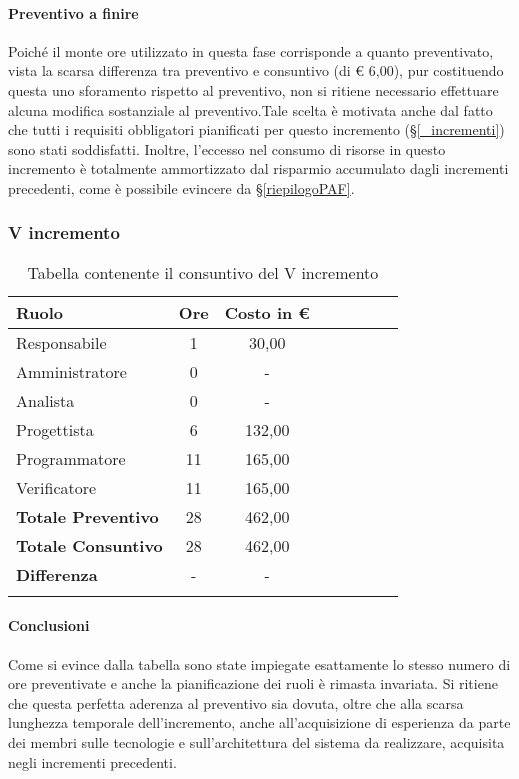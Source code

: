 \paragraph{Preventivo a finire}
Poiché il monte ore utilizzato in questa fase corrisponde a quanto preventivato, vista la scarsa differenza tra preventivo e consuntivo (di € 6,00), pur costituendo questa uno sforamento rispetto al preventivo, non si ritiene necessario effettuare alcuna modifica sostanziale al preventivo.Tale scelta è motivata anche dal fatto che tutti i requisiti obbligatori pianificati per questo incremento (\S\ref{_incrementi}) sono stati soddisfatti. Inoltre, l'eccesso nel consumo di risorse in questo incremento è totalmente ammortizzato dal risparmio accumulato dagli incrementi precedenti, come è possibile evincere da \S\ref{riepilogoPAF}.

\subsubsection{V incremento}\label{_consuntivoImp2}
\begin{longtable}{|l|c|c|c|c|c|c|c|}
	\hline
	\rowcolor{lighter-grayer}
	\textbf{Ruolo}             & \textbf{Ore} & \textbf{Costo in €} \\
	\hline
	\endfirsthead

	\hline
	Responsabile               & 1           & 30,00    \\
	\hline
	\hline
	Amministratore             & 0       & -      \\
	\hline
	\hline
	Analista                   & 0       & -   \\
	\hline
	\hline
	Progettista                & 6            & 132,00              \\
	\hline
	\hline
	Programmatore              & 11            & 165,00                  \\
	\hline
	\hline
	Verificatore               & 11       & 165,00    \\
	\hline
	\textbf{Totale Preventivo} & 28          & 462,00            \\
	\hline
	\hline
	\textbf{Totale Consuntivo} & 28          & 462,00            \\
	\hline
	\hline
	\textbf{Differenza}        & -           & -           \\
	\hline
	\rowcolor{white}
	\caption{Tabella contenente il consuntivo del V incremento}
\end{longtable}
\paragraph{Conclusioni}
Come si evince dalla tabella sono state impiegate esattamente lo stesso numero di ore preventivate e anche la pianificazione dei ruoli è rimasta invariata. Si ritiene che questa perfetta aderenza al preventivo sia dovuta, oltre che alla scarsa lunghezza temporale dell'incremento, anche all'acquisizione di esperienza da parte dei membri sulle tecnologie e sull'architettura del sistema da realizzare, acquisita negli incrementi precedenti.

